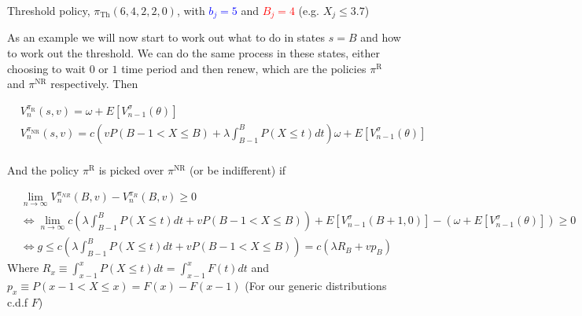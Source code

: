 \documentclass[a4paper,10pt]{article}
\theoremstyle{definition}
\theoremstyle{definition}
\theoremstyle{remark}
\theoremstyle{definition}
\begin{document}
\begin{myfigure}
\begin{center}
{
}
\end{center}
\caption{Threshold policy, $\pi_{\text{Th}}(6,4,2,2,0)$, with \textcolor{blue}{$b_{j}=5$} and \textcolor{red}{$B_{j}=4$} (e.g. $X_{j} \leq 3.7$)}
\end{myfigure}

As an example we will now start to work out what to  do in states $s=B$ and how to work out the threshold. We can do the same process in these states, either choosing to wait $0$ or $1$ time period and then renew, which are the policies $\pi^{\text{R}}$ and $\pi^{\text{NR}}$ respectively. Then

\begin{align*}
&V_{n}^{\pi_{\text{R}}}(s,v)= \omega + E[V_{n-1}^{\sigma}(\theta)] \\
&V_{n}^{\pi_{\text{NR}}}(s,v)= c (vP(B-1 < X \leq B) + \lambda \int_{B-1}^{B} P(X \leq t ) dt) \omega + E[V_{n-1}^{\sigma}(\theta)] \\
\end{align*}

And the policy $\pi^{\text{R}}$ is picked over $\pi^{\text{NR}}$ (or be indifferent) if

\begin{align*}
&\lim\limits_{n \rightarrow \infty} V_{n}^{\pi_{NR}} (B,v) - V_{n}^{\pi_{R}}(B,v) \geq 0 \\
& \iff \lim\limits_{n \rightarrow \infty} c (\lambda \int_{B-1}^{B} P(X \leq t ) dt + v P(B-1 < X \leq B)) + E[V_{n-1}^{\sigma}(B+1,0)] - (\omega + E[V_{n-1}^{\sigma}(\theta)]) \geq 0 \\
& \iff g \leq c (\lambda \int_{B-1}^{B} P(X \leq t ) dt +v P(B-1 < X \leq B)) = c( \lambda R_{B} + v p_{B})
\end{align*}
Where $R_{x} \equiv \int_{x-1}^{x} P(X \leq t ) dt = \int_{x-1}^{x} F(t) dt$ and $p_{x} \equiv P(x-1 < X \leq x) = F(x)-F(x-1)$ (For our generic distributions c.d.f $F$)
\end{document}
